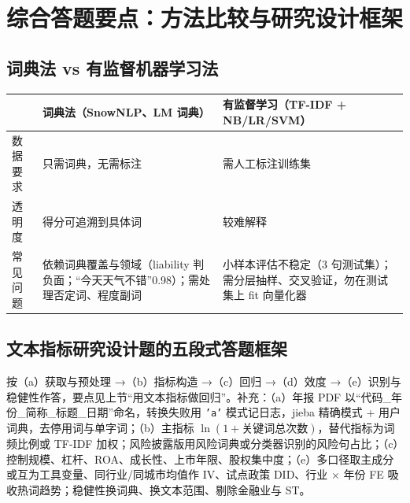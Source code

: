 \section{综合答题要点：方法比较与研究设计框架}

\subsection{词典法 vs 有监督机器学习法}
\begin{center}\small
\begin{tabularx}{\linewidth}{@{}p{1.6cm}LL@{}}
\toprule
 & 词典法（SnowNLP、LM 词典）& 有监督学习（TF-IDF + NB/LR/SVM）\\
\midrule
数据要求 & 只需词典，无需标注 & 需人工标注训练集 \\
透明度 & 得分可追溯到具体词 & 较难解释 \\
常见问题 & 依赖词典覆盖与领域（liability 判负面；“今天天气不错”0.98）；需处理否定词、程度副词 & 小样本评估不稳定（3 句测试集）；需分层抽样、交叉验证，勿在测试集上 fit 向量化器 \\
\bottomrule
\end{tabularx}
\end{center}

\subsection{文本指标研究设计题的五段式答题框架}
按（a）获取与预处理 →（b）指标构造 →（c）回归 →（d）效度 →（e）识别与稳健性作答，要点见上节“用文本指标做回归”。补充：（a）年报 PDF 以“代码\_年份\_简称\_标题\_日期”命名，转换失败用 \texttt{'a'} 模式记日志，jieba 精确模式 + 用户词典，去停用词与单字词；（b）主指标 $\ln(1+\text{关键词总次数})$，替代指标为词频比例或 TF-IDF 加权；风险披露版用风险词典或分类器识别的风险句占比；（c）控制规模、杠杆、ROA、成长性、上市年限、股权集中度；（e）多口径取主成分或互为工具变量、同行业/同城市均值作 IV、试点政策 DID、行业 × 年份 FE 吸收热词趋势；稳健性换词典、换文本范围、剔除金融业与 ST。
